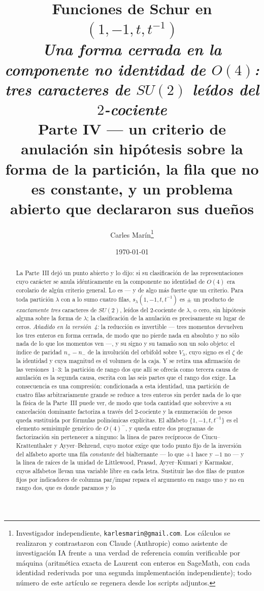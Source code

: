 \documentclass[11pt,a4paper]{article}
\title{\textbf{\Large Funciones de Schur en $(1,-1,t,t^{-1})$}\\[7pt]
\large\textnormal{\itshape Una forma cerrada en la componente no identidad de $O(4)$:\\
tres caracteres de $SU(2)$ le\'idos del $2$-cociente}\\[8pt]
\normalsize\textnormal{Parte IV --- un criterio de anulaci\'on sin hip\'otesis sobre la forma
de la partici\'on, la fila que no es constante, y un problema abierto que declararon sus
due\~nos}}
\author{Carles Mar\'in\thanks{Investigador independiente, \texttt{karlesmarin@gmail.com}.
Los c\'alculos se realizaron y contrastaron con Claude (Anthropic) como asistente de
investigaci\'on IA frente a una verdad de referencia com\'un verificable por m\'aquina
(aritm\'etica exacta de Laurent con enteros en SageMath, con cada identidad rederivada por una
segunda implementaci\'on independiente); todo n\'umero de este art\'iculo se regenera desde los
scripts adjuntos.}}
\date{\today}
\begin{document}
\maketitle

\begin{abstract}
\noindent
La Parte~III dej\'o un punto abierto y lo dijo: si su clasificaci\'on de las representaciones
cuyo car\'acter se anula id\'enticamente en la componente no identidad de $O(4)$ era corolario de
alg\'un criterio general. Lo es --- y de algo m\'as fuerte que un criterio. Para toda
partici\'on $\lambda$ con a lo sumo cuatro filas, $s_\lambda(1,-1,t,t^{-1})$ es $\pm$ un
producto de \emph{exactamente tres} caracteres de $SU(2)$, le\'idos del $2$-cociente de
$\lambda$, o cero, sin hip\'otesis alguna sobre la forma de $\lambda$; la clasificaci\'on de la
anulaci\'on es precisamente su lugar de ceros.
\emph{A\~nadido en la versi\'on~4:} la reducci\'on es invertible --- tres momentos devuelven los
tres enteros en forma cerrada, de modo que no pierde nada en absoluto y no s\'olo nada de lo que
los momentos ven ---, y su signo y su tama\~no son un solo objeto: el \'indice de paridad
$n_+-n_-$ de la involuci\'on del orbifold sobre $V_\lambda$, cuyo signo es el $\zeta$ de la
identidad y cuya magnitud es el volumen de la caja. Y se retira una afirmaci\'on de las
versiones~1--3: la partici\'on de rango
dos que all\'i se ofrec\'ia como tercera causa de anulaci\'on es la segunda causa, escrita con las
seis partes que el rango dos exige. La consecuencia es una compresi\'on:
condicionada a esta identidad, una partici\'on de cuatro filas arbitrariamente grande se reduce
a tres enteros sin perder nada de lo que la f\'isica de la Parte~III puede ver, de modo que toda
cantidad que sobrevive a su cancelaci\'on dominante factoriza a trav\'es del $2$-cociente y la
enumeraci\'on de pesos queda sustituida por f\'ormulas polin\'omicas expl\'icitas. El alfabeto $\{1,-1,t,t^{-1}\}$ es el elemento
semisimple gen\'erico de $O(4)^-$, y queda entre dos programas de factorizaci\'on sin
pertenecer a ninguno: la l\'inea de pares rec\'iprocos de Ciucu--Krattenthaler y
Ayyer--Behrend, cuyo motor exige que todo punto fijo de la inversi\'on del alfabeto aporte una
fila \emph{constante} del bialternante --- lo que $+1$ hace y $-1$ no --- y la l\'inea de
ra\'ices de la unidad de Littlewood, Prasad, Ayyer--Kumari y Karmakar, cuyos alfabetos llevan
una variable libre en cada letra. Sustituir las dos filas de puntos fijos por indicadores de
columna par/impar repara el argumento en rango uno y no en rango dos, que es donde paramos y lo

\end{abstract}
\end{document}
